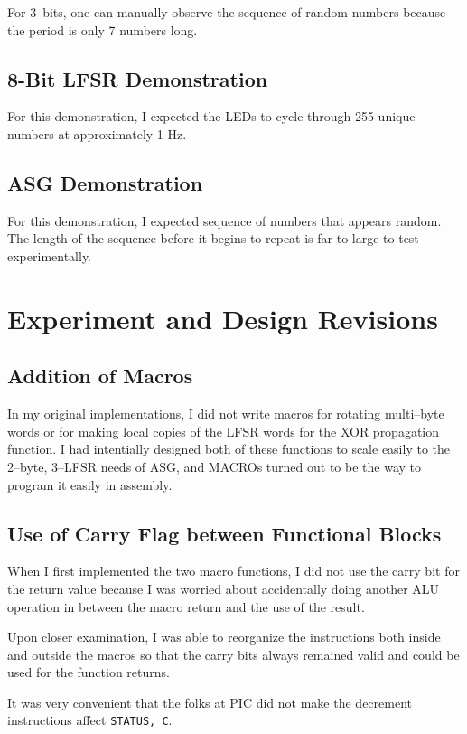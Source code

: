 \documentclass[11pt]{article}
\begin{document}
For 3--bits,
one can manually observe the sequence of random numbers because
the period is only 7 numbers long.

\subsection{8-Bit LFSR Demonstration}

For this demonstration, I expected the LEDs to cycle through 255 unique
numbers at approximately 1 Hz.

\subsection{ASG Demonstration}

For this demonstration, I expected sequence of numbers that appears
random. The length of the sequence before it begins to repeat is far
to large to test experimentally.

\section{Experiment and Design Revisions}

\subsection{Addition of Macros}

In my original implementations, I did not write macros for rotating multi--byte
words or for making local copies of the LFSR words for the XOR propagation function.
I had intentially designed both of these functions to scale easily to the 2--byte,
3--LFSR needs of ASG, and MACROs turned out to be the way to program it easily in assembly.

\subsection{Use of Carry Flag between Functional Blocks}

When I first implemented the two macro functions, I did not use the carry
bit for the return value because I was worried about accidentally doing
another ALU operation in between the macro return and the use of the result.

Upon closer examination, I was able to reorganize the instructions both
inside and outside the macros so that the carry bits always remained valid and
could be used for the function returns.

It was very convenient that the folks at PIC did not make the decrement instructions
affect \texttt{STATUS, C}.
\end{document}
